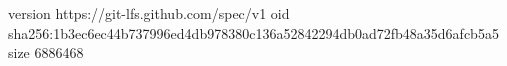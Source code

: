 version https://git-lfs.github.com/spec/v1
oid sha256:1b3ec6ec44b737996ed4db978380c136a52842294db0ad72fb48a35d6afcb5a5
size 6886468
